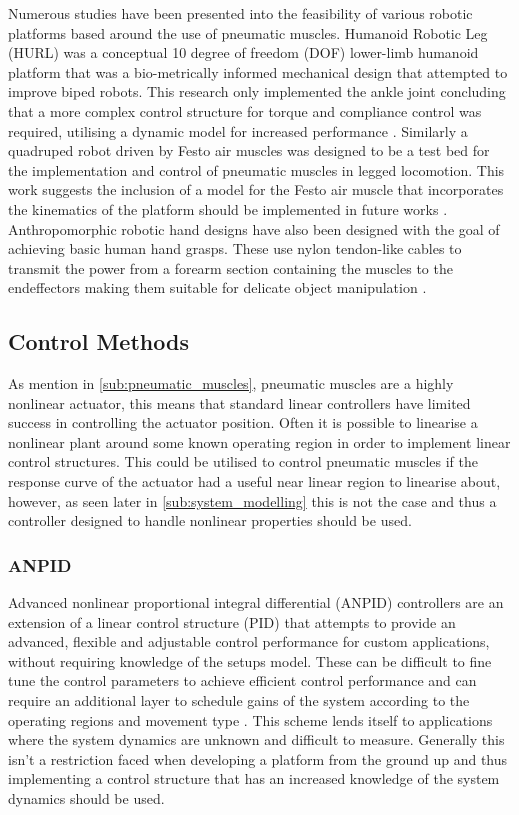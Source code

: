 \documentclass[11pt,a4paper]{article}
\begin{document}
Numerous studies have been presented into the feasibility of various robotic platforms based around the use of pneumatic muscles. Humanoid Robotic Leg (HURL) was a conceptual 10 degree of freedom (DOF) lower-limb humanoid platform that was a bio-metrically informed mechanical design that attempted to improve biped robots. This research only implemented the ankle joint concluding that a more complex control structure for torque and compliance control was required, utilising a dynamic model for increased performance \cite{andrikopoulos_nikolakopoulos_2017}. Similarly a quadruped robot driven by Festo air muscles was designed to be a test bed for the implementation and control of pneumatic muscles in legged locomotion. This work suggests the inclusion of a model for the Festo air muscle that incorporates the kinematics of the platform should be implemented in future works \cite{aschenbeck_kern_bachmann_quinn}. Anthropomorphic robotic hand designs have also been designed with the goal of achieving basic human hand grasps. These use nylon tendon-like cables to transmit the power from a forearm section containing the muscles to the endeffectors making them suitable for delicate object manipulation \cite{lau_chai_2012}.

\subsection{Control Methods}
\label{sub:control_methods}
As mention in \ref{sub:pneumatic_muscles}, pneumatic muscles are a highly nonlinear actuator, this means that standard linear controllers have limited success in controlling the actuator position. Often it is possible to linearise a nonlinear plant around some known operating region in order to implement linear control structures. This could be utilised to control pneumatic muscles if the response curve of the actuator had a useful near linear region to linearise about, however, as seen later in \ref{sub:system_modelling} this is not the case and thus a controller designed to handle nonlinear properties should be used. 

\subsubsection{ANPID}
\label{sub:pid}
Advanced nonlinear proportional integral differential (ANPID) controllers are an extension of a linear control structure (PID) that attempts to provide an advanced, flexible and adjustable control performance for custom applications, without requiring knowledge of the setups model. These can be difficult to fine tune the control parameters to achieve efficient control performance and can require an additional layer to schedule gains of the system according to the operating regions and movement type \cite{andrikopoulos_nikolakopoulos_2017}. This scheme lends itself to applications where the system dynamics are unknown and difficult to measure. Generally this isn't a restriction faced when developing a platform from the ground up and thus implementing a control structure that has an increased knowledge of the system dynamics should be used.
\end{document}
